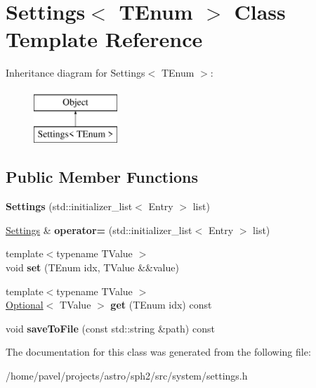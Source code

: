 \hypertarget{classSettings}{}\section{Settings$<$ T\+Enum $>$ Class Template Reference}
\label{classSettings}
Inheritance diagram for Settings$<$ T\+Enum $>$\+:\begin{figure}[H]
\begin{center}
\leavevmode
\includegraphics[height=2.000000cm]{classSettings}
\end{center}
\end{figure}
\subsection*{Public Member Functions}
\begin{DoxyCompactItemize}
\item 
\hypertarget{classSettings_a17e41d20319e5cbfcb1d0eedb5d44614}{}\label{classSettings_a17e41d20319e5cbfcb1d0eedb5d44614} 
{\bfseries Settings} (std\+::initializer\+\_\+list$<$ Entry $>$ list)
\item 
\hypertarget{classSettings_a9d923cf0b788195b1b327a41eb3c0322}{}\label{classSettings_a9d923cf0b788195b1b327a41eb3c0322} 
\hyperlink{classSettings}{Settings} \& {\bfseries operator=} (std\+::initializer\+\_\+list$<$ Entry $>$ list)
\item 
\hypertarget{classSettings_a15a2bed9d47783ac2b53079f65984d24}{}\label{classSettings_a15a2bed9d47783ac2b53079f65984d24} 
{\footnotesize template$<$typename T\+Value $>$ }\\void {\bfseries set} (T\+Enum idx, T\+Value \&\&value)
\item 
\hypertarget{classSettings_a83eb52723ff2bdbd5858a732cf6dff68}{}\label{classSettings_a83eb52723ff2bdbd5858a732cf6dff68} 
{\footnotesize template$<$typename T\+Value $>$ }\\\hyperlink{classOptional}{Optional}$<$ T\+Value $>$ {\bfseries get} (T\+Enum idx) const
\item 
\hypertarget{classSettings_ac7f86c77abf3e0bab30fa1573a8785d2}{}\label{classSettings_ac7f86c77abf3e0bab30fa1573a8785d2} 
void {\bfseries save\+To\+File} (const std\+::string \&path) const
\end{DoxyCompactItemize}


The documentation for this class was generated from the following file\+:\begin{DoxyCompactItemize}
\item 
/home/pavel/projects/astro/sph2/src/system/settings.\+h\end{DoxyCompactItemize}
